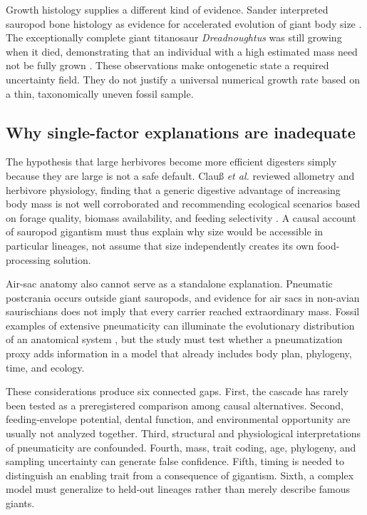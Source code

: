 \documentclass[conference]{IEEEtran}
\begin{document}
Growth histology supplies a different kind of evidence. Sander interpreted sauropod bone histology as evidence for accelerated evolution of giant body size \cite{sander2004}. The exceptionally complete giant titanosaur \emph{Dreadnoughtus} was still growing when it died, demonstrating that an individual with a high estimated mass need not be fully grown \cite{lacovara2014}. These observations make ontogenetic state a required uncertainty field. They do not justify a universal numerical growth rate based on a thin, taxonomically uneven fossil sample.

\subsection{Why single-factor explanations are inadequate}

The hypothesis that large herbivores become more efficient digesters simply because they are large is not a safe default. Clau\ss{} \emph{et al.} reviewed allometry and herbivore physiology, finding that a generic digestive advantage of increasing body mass is not well corroborated and recommending ecological scenarios based on forage quality, biomass availability, and feeding selectivity \cite{clauss2013}. A causal account of sauropod gigantism must thus explain why size would be accessible in particular lineages, not assume that size independently creates its own food-processing solution.

Air-sac anatomy also cannot serve as a standalone explanation. Pneumatic postcrania occurs outside giant sauropods, and evidence for air sacs in non-avian saurischians does not imply that every carrier reached extraordinary mass. Fossil examples of extensive pneumaticity can illuminate the evolutionary distribution of an anatomical system \cite{sereno2008}, but the study must test whether a pneumatization proxy adds information in a model that already includes body plan, phylogeny, time, and ecology.

These considerations produce six connected gaps. First, the cascade has rarely been tested as a preregistered comparison among causal alternatives. Second, feeding-envelope potential, dental function, and environmental opportunity are usually not analyzed together. Third, structural and physiological interpretations of pneumaticity are confounded. Fourth, mass, trait coding, age, phylogeny, and sampling uncertainty can generate false confidence. Fifth, timing is needed to distinguish an enabling trait from a consequence of gigantism. Sixth, a complex model must generalize to held-out lineages rather than merely describe famous giants.
\end{document}
